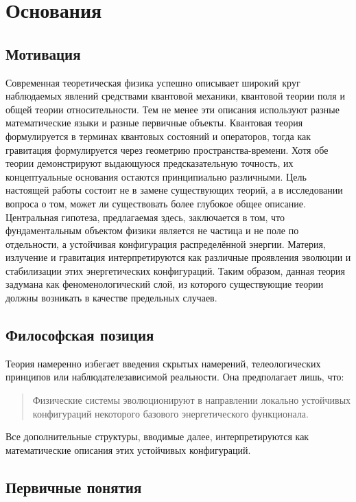 \chapter{Основания}

\section{Мотивация}

Современная теоретическая физика успешно описывает широкий круг наблюдаемых явлений средствами квантовой механики, квантовой теории поля и общей теории относительности. Тем не менее эти описания используют разные математические языки и разные первичные объекты. Квантовая теория формулируется в терминах квантовых состояний и операторов, тогда как гравитация формулируется через геометрию пространства-времени. Хотя обе теории демонстрируют выдающуюся предсказательную точность, их концептуальные основания остаются принципиально различными. Цель настоящей работы состоит не в замене существующих теорий, а в исследовании вопроса о том, может ли существовать более глубокое общее описание. Центральная гипотеза, предлагаемая здесь, заключается в том, что фундаментальным объектом физики является не частица и не поле по отдельности, а устойчивая конфигурация распределённой энергии. Материя, излучение и гравитация интерпретируются как различные проявления эволюции и стабилизации этих энергетических конфигураций. Таким образом, данная теория задумана как феноменологический слой, из которого существующие теории должны возникать в качестве предельных случаев.

\section{Философская позиция}

Теория намеренно избегает введения скрытых намерений, телеологических принципов или наблюдателезависимой реальности. Она предполагает лишь, что:

\begin{quote}
Физические системы эволюционируют в направлении локально устойчивых конфигураций
некоторого базового энергетического функционала.
\end{quote}

Все дополнительные структуры, вводимые далее, интерпретируются как математические описания этих устойчивых конфигураций.

\section{Первичные понятия}

